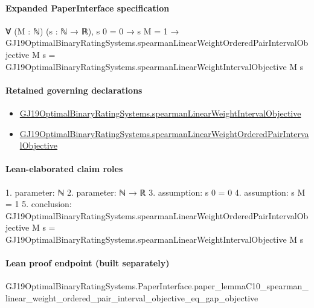 \documentclass[10pt]{article}
\begin{document}
\paragraph{Expanded PaperInterface specification}
\begin{ReviewVerbatim}
∀ (M : ℕ) (s : ℕ → ℝ),
  s 0 = 0 →
    s M = 1 →
      GJ19OptimalBinaryRatingSystems.spearmanLinearWeightOrderedPairIntervalObjective M s =
        GJ19OptimalBinaryRatingSystems.spearmanLinearWeightIntervalObjective M s
\end{ReviewVerbatim}

\paragraph{Retained governing declarations}
\begin{itemize}\raggedright
\item \hyperlink{governing-declaration-4cdb4ece5cf621eb}{GJ19\allowbreak{}Optimal\allowbreak{}Binary\allowbreak{}Rating\allowbreak{}Systems.\allowbreak{}spearman\allowbreak{}Linear\allowbreak{}Weight\allowbreak{}Interval\allowbreak{}Objective}
\item \hyperlink{paper-prerequisite-1a9e2c8c37b126ef}{GJ19\allowbreak{}Optimal\allowbreak{}Binary\allowbreak{}Rating\allowbreak{}Systems.\allowbreak{}spearman\allowbreak{}Linear\allowbreak{}Weight\allowbreak{}Ordered\allowbreak{}Pair\allowbreak{}Interval\allowbreak{}Objective}
\end{itemize}
\paragraph{Lean-elaborated claim roles}\begin{ReviewVerbatim}
1. parameter: ℕ
2. parameter: ℕ → ℝ
3. assumption: s 0 = 0
4. assumption: s M = 1
5. conclusion: GJ19OptimalBinaryRatingSystems.spearmanLinearWeightOrderedPairIntervalObjective M s =
  GJ19OptimalBinaryRatingSystems.spearmanLinearWeightIntervalObjective M s
\end{ReviewVerbatim}

\paragraph{Lean proof endpoint (built separately)}\begin{ReviewVerbatim}
GJ19OptimalBinaryRatingSystems.PaperInterface.paper_lemmaC10_spearman_linear_weight_ordered_pair_interval_objective_eq_gap_objective
\end{ReviewVerbatim}
\end{document}
